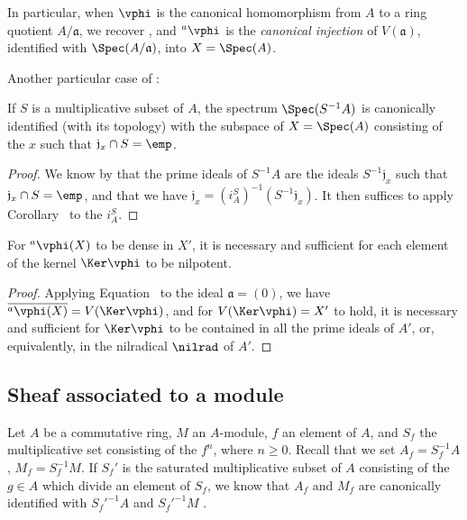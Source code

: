 \begin{env}[1.2.5]
\label{I.1.2.5}
In particular, when $\vphi$ is the canonical homomorphism from $A$ to a ring quotient $A/\mathfrak{a}$, we recover , and ${}^a\vphi$ is the \emph{canonical injection} of $V(\mathfrak{a})$, identified with $\Spec(A/\mathfrak{a})$, into $X=\Spec(A)$.
\end{env}

Another particular case of :
\begin{corollary}[1.2.6]
\label{I.1.2.6}
If $S$ is a multiplicative subset of $A$, the spectrum $\Spec(S^{-1}A)$ is canonically identified (with its topology) with the subspace of $X=\Spec(A)$ consisting of the $x$ such that $\mathfrak{j}_x\cap S=\emp$.
\end{corollary}

\begin{proof}
We know by  that the prime ideals of $S^{-1}A$ are the ideals $S^{-1}\mathfrak{j}_x$ such that $\mathfrak{j}_x\cap S=\emp$, and that we have $\mathfrak{j}_x=(i_A^S)^{-1}(S^{-1}\mathfrak{j}_x)$.
It then suffices to apply Corollary~ to the $i_A^S$.
\end{proof}

\begin{corollary}[1.2.7]
\label{I.1.2.7}
For ${}^a\vphi(X)$ to be dense in $X'$, it is necessary and sufficient for each element of the kernel $\Ker\vphi$ to be nilpotent.
\end{corollary}

\begin{proof}
Applying Equation~ to the ideal $\mathfrak{a}=(0)$, we have $\overline{{}^a\vphi(X)}=V(\Ker\vphi)$, and for $V(\Ker\vphi)=X'$ to hold, it is necessary and sufficient for $\Ker\vphi$ to be contained in all the prime ideals of $A'$, or, equivalently, in the nilradical $\nilrad$ of $A'$.
\end{proof}

\subsection{Sheaf associated to a module}
\label{subsection:I.1.3}

\begin{env}[1.3.1]
\label{I.1.3.1}
Let $A$ be a commutative ring, $M$ an $A$-module, $f$ an element of $A$, and $S_f$ the multiplicative set consisting of the $f^n$, where $n\geq 0$.
Recall that we set $A_f=S_f^{-1}A$, $M_f=S_f^{-1}M$.
If $S_f'$ is the saturated multiplicative subset of $A$ consisting of the $g\in A$ which divide an element of $S_f$, we know that $A_f$ and $M_f$ are canonically identified with ${S_f'}^{-1}A$ and ${S_f'}^{-1}M$ .
\end{env}

